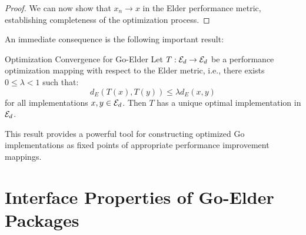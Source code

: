 \begin{twocolumnlayout}
\begin{proof}
We can now show that $x_n \to x$ in the Elder performance metric, establishing completeness of the optimization process.
\end{proof}

An immediate consequence is the following important result:

\begin{corollary}{Optimization Convergence for Go-Elder}{}
Let $T: \mathcal{E}_{d} \to \mathcal{E}_{d}$ be a performance optimization mapping with respect to the Elder metric, i.e., there exists $0 \leq \lambda < 1$ such that:
\begin{equation}
d_E(T(x), T(y)) \leq \lambda d_E(x, y)
\end{equation}
for all implementations $x, y \in \mathcal{E}_{d}$. Then $T$ has a unique optimal implementation in $\mathcal{E}_{d}$.
\end{corollary}

This result provides a powerful tool for constructing optimized Go implementations as fixed points of appropriate performance improvement mappings.
\end{twocolumnlayout}

\section{Interface Properties of Go-Elder Packages}

